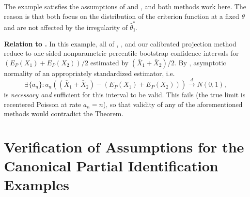 \documentclass[letterpaper,11pt]{article}
\theoremstyle{myplain}
\theoremstyle{mydefinition}
\theoremstyle{myremark}
\renewcommand{\cite}{\citet}
\numberwithin{equation}{section}
\numberwithin{figure}{section}
\begin{document}
\begin{appendices}
The example satisfies the assumptions of \cite{AS} and \cite{Andrews_Guggenberger2009bET}, and both methods work here. The reason is that both focus on the distribution of the criterion function at a fixed $\theta $ and are not affected by the irregularity of $\hat{\theta }_{1}^{\ast }$.


\noindent\textbf{Relation to \cite{Mammen92}.}
In this example, all of \cite{BCS14_subv}, \cite{PakesPorterHo2011}, and our calibrated projection method reduce to one-sided nonparametric percentile bootstrap confidence intervals for $(E_P(X_1)+E_P(X_2))/2$ estimated by $(\bar{X}_{1}+\bar{X}_{2})/2$. By \cite[Theorem 1]{Mammen92}, asymptotic normality of an appropriately standardized estimator, i.e.
\begin{equation*}
\exists \{a_{n}\}:a_{n}\left( (\bar{X}_{1}+\bar{X}_{2})-(E_P(X_1)+E_P(X_2))\right) \overset{d}{\rightarrow }N(0,1),
\end{equation*}
is \textit{necessary and} sufficient for this interval to be valid. This fails (the true limit is recentered Poisson at rate $a_n=n$), so that validity of any of the aforementioned methods would contradict the Theorem. 







\section{Verification of Assumptions for the Canonical Partial Identification Examples}\label{sec:verify_examples}


\end{appendices}
\end{document}
